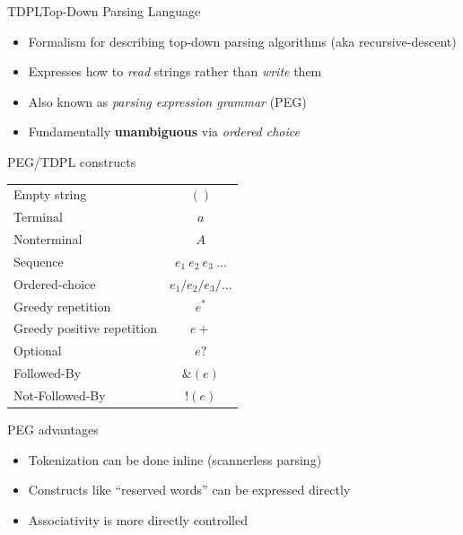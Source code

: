 \documentclass{beamer}
\begin{document}
\begin{frame}{TDPL}{Top-Down Parsing Language}
  \begin{itemize}
    \item Formalism for describing top-down parsing algorithms (aka
      recursive-descent)
    \item Expresses how to \textit{read} strings rather than \textit{write}
      them
    \item Also known as \textit{parsing expression grammar} (PEG)
    \item Fundamentally \textbf{unambiguous} via \textit{ordered choice}
  \end{itemize}
\end{frame}

\begin{frame}{PEG/TDPL constructs}
  \begin{tabular*}{.75\textwidth}[t]{|l|c|}
    Empty string               & $()$ \\[5pt]
    Terminal                   & $a$ \\[5pt]
    Nonterminal                & $A$ \\[5pt]
    Sequence                   & $e_1~e_2~e_3~...$ \\[5pt]
    Ordered-choice             & $e_1 \slash e_2 \slash e_3 \slash ...$ \\[5pt]
    Greedy repetition          & $e^*$ \\[5pt]
    Greedy positive repetition & $e+$ \\[5pt]
    Optional                   & $e?$ \\[5pt]
    Followed-By                & $\&(e)$ \\[5pt]
    Not-Followed-By            & $!(e)$
  \end{tabular*}
\end{frame}

\begin{frame}{PEG advantages}
  \begin{itemize}
  \item Tokenization can be done inline (scannerless parsing)
  \item Constructs like ``reserved words'' can be expressed directly
  \item Associativity is more directly controlled
  \end{itemize}
\end{frame}
\end{document}
